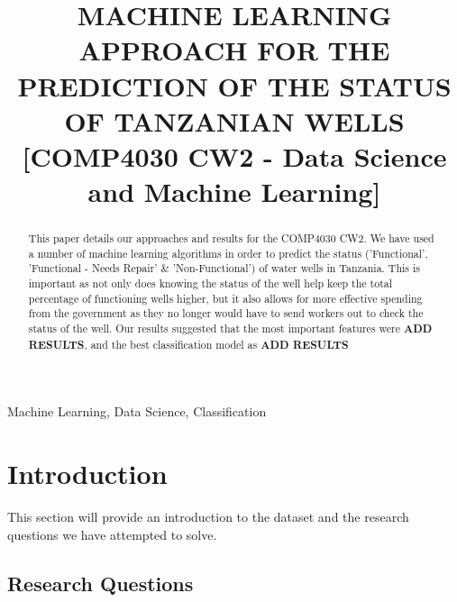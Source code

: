 \documentclass[conference]{IEEEtran}
\begin{document}
\title{MACHINE LEARNING APPROACH FOR THE PREDICTION OF THE STATUS OF TANZANIAN WELLS [COMP4030 CW2 - Data Science and Machine Learning]
}

\author{
\and
{}
}

\maketitle

\begin{abstract}
  This paper details our approaches and results for the COMP4030 CW2. We have used a number of machine learning algorithms in order to predict the status ('Functional', 'Functional - Needs Repair' \& 'Non-Functional') of water wells in Tanzania. This is important as not only does knowing the status of the well help keep the total percentage of functioning wells higher, but it also allows for more effective spending from the government as they no longer would have to send workers out to check the status of the well. Our results suggested that the most important features were \textbf{ADD RESULTS}, and the best classification model as \textbf{ADD RESULTS}
\end{abstract}

\begin{IEEEkeywords}
  Machine Learning, Data Science, Classification
\end{IEEEkeywords}

\section{Introduction}

This section will provide an introduction to the dataset and the research questions we have attempted to solve.

\subsection{Research Questions}
\end{document}
